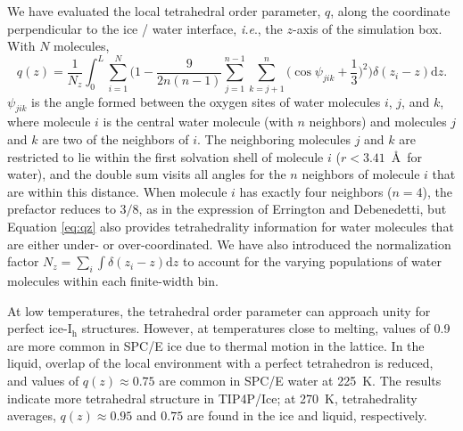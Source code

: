 We have evaluated the local tetrahedral order parameter, $q$, along
the coordinate perpendicular to the ice / water interface,
\textit{i.e}., the $z$-axis of the simulation box. With $N$ molecules,
\begin{equation}
q(z) = \frac{1}{N_z} \int_0^L \sum_{i=1}^{N} \Bigg(1 -\frac{9}{2n(n-1)}\sum_{j=1}^{n-1}
\sum_{k=j+1}^{n} \bigg(\cos\psi_{jik}+\frac{1}{3}\bigg)^2\Bigg)
\delta(z_{i}-z)\mathrm{d}z .
\label{eq:qz}
\end{equation}
$\psi_{jik}$ is the angle formed between the oxygen sites of water
molecules $i$, $j$, and $k$, where molecule $i$ is the central water
molecule (with $n$ neighbors) and molecules $j$ and $k$ are two of the
neighbors of $i$.  The neighboring molecules $j$ and $k$ are
restricted to lie within the first solvation shell of molecule $i$
($r < 3.41$~\AA\ for water), and the double sum visits all angles for
the $n$ neighbors of molecule $i$ that are within this distance.  When
molecule $i$ has exactly four neighbors ($n=4$), the prefactor reduces
to $3/8$, as in the expression of Errington and Debenedetti, but
Equation \eqref{eq:qz} also provides tetrahedrality information for water
molecules that are either under- or over-coordinated. We have also
introduced the normalization factor
$N_z = \sum_i \int \delta(z_i - z) \mathrm{d}z$ to account for the
varying populations of water molecules within each finite-width bin.

At low temperatures, the tetrahedral order parameter can approach
unity for perfect ice-I$_\mathrm{h}$ structures. However, at
temperatures close to melting, values of 0.9 are more common in SPC/E
ice due to thermal motion in the lattice. In the liquid, overlap of
the local environment with a perfect tetrahedron is reduced, and
values of $q(z) \approx 0.75$ are common in SPC/E water at 225~K. The
results indicate more tetrahedral structure in TIP4P/Ice; at
270~K, tetrahedrality averages, $q(z) \approx 0.95$ and $0.75$ are
found in the ice and liquid, respectively.

